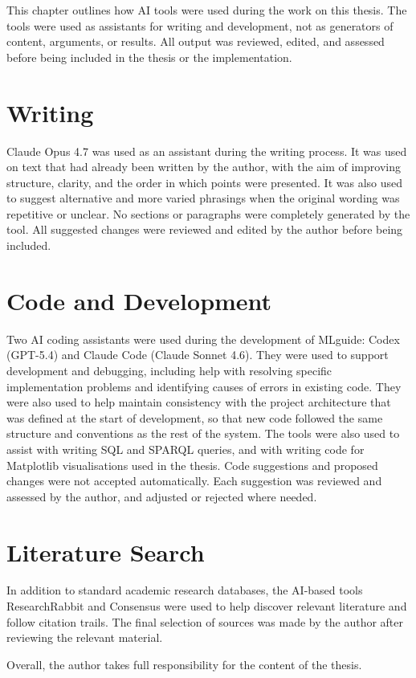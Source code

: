 \label{ch:ai-declaration}

This chapter outlines how AI tools were used during the work on this
thesis. The tools were used as assistants for writing and development,
not as generators of content, arguments, or results. All output was
reviewed, edited, and assessed before being included in the thesis or
the implementation.

\section*{Writing}
\label{sec:ai-declaration-writing}

Claude Opus 4.7 was used as an assistant during the writing process.
It was used on text that had already been written by the author, with
the aim of improving structure, clarity, and the order in which points
were presented. It was also used to suggest alternative and more varied
phrasings when the original wording was repetitive or unclear. No
sections or paragraphs were completely generated by the tool. All suggested changes
were reviewed and edited by the author before being included.

\section*{Code and Development}
\label{sec:ai-declaration-code}

Two AI coding assistants were used during the development of MLguide:
Codex (GPT-5.4) and Claude Code (Claude Sonnet 4.6). They were used
to support development and debugging, including help with resolving
specific implementation problems and identifying causes of errors in
existing code. They were also used to help maintain consistency with
the project architecture that was defined at the start of development,
so that new code followed the same structure and conventions as the
rest of the system. The tools were also used to assist with writing
SQL and SPARQL queries, and with writing code for Matplotlib
visualisations used in the thesis. Code suggestions and proposed
changes were not accepted automatically. Each suggestion was reviewed
and assessed by the author, and adjusted or rejected where
needed.

\section*{Literature Search}
\label{sec:ai-declaration-literature}

In addition to standard academic research databases, the AI-based tools ResearchRabbit
and Consensus were used to help discover relevant literature and follow
citation trails. The final selection of sources was made by the author
after reviewing the relevant material.

Overall, the author takes full responsibility for the content of the thesis.